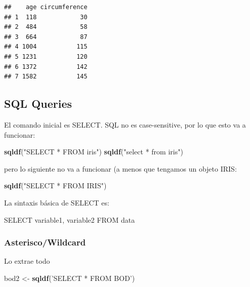 \documentclass[]{book}
\newenvironment{Shaded}{\begin{snugshade}}{\end{snugshade}}
\newcommand{\KeywordTok}[1]{\textcolor[rgb]{0.13,0.29,0.53}{\textbf{#1}}}
\newcommand{\StringTok}[1]{\textcolor[rgb]{0.31,0.60,0.02}{#1}}
\newcommand{\NormalTok}[1]{#1}
\begin{document}
\begin{verbatim}
##    age circumference
## 1  118            30
## 2  484            58
## 3  664            87
## 4 1004           115
## 5 1231           120
## 6 1372           142
## 7 1582           145
\end{verbatim}

\subsection{SQL Queries}\label{sql-queries}

El comando inicial es SELECT. SQL no es case-sensitive, por lo que esto
va a funcionar:

\begin{Shaded}
\begin{Highlighting}[]
\KeywordTok{sqldf}\NormalTok{(}\StringTok{"SELECT * FROM iris"}\NormalTok{)}
\KeywordTok{sqldf}\NormalTok{(}\StringTok{"select * from iris"}\NormalTok{)}
\end{Highlighting}
\end{Shaded}

pero lo siguiente no va a funcionar (a menos que tengamos un objeto
IRIS:

\begin{Shaded}
\begin{Highlighting}[]
\KeywordTok{sqldf}\NormalTok{(}\StringTok{"SELECT * FROM IRIS"}\NormalTok{)}
\end{Highlighting}
\end{Shaded}

La sintaxis básica de SELECT es:

\begin{Shaded}
\begin{Highlighting}[]
\NormalTok{SELECT variable1, variable2 FROM data}
\end{Highlighting}
\end{Shaded}

\subsubsection{Asterisco/Wildcard}\label{asteriscowildcard}

Lo extrae todo

\begin{Shaded}
\begin{Highlighting}[]
\NormalTok{bod2 <-}\StringTok{ }\KeywordTok{sqldf}\NormalTok{(}\StringTok{'SELECT * FROM BOD'}\NormalTok{)}
\end{Highlighting}
\end{Shaded}
\end{document}

